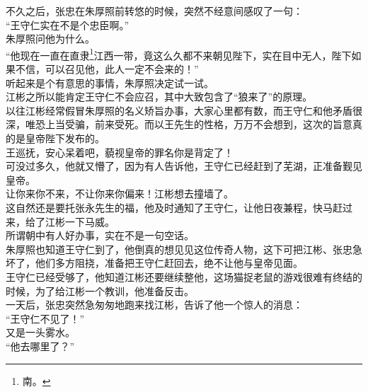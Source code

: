 \begin{multicols}{\theparacolNo}
不久之后，张忠在朱厚照前转悠的时候，突然不经意间感叹了一句：\\

“王守仁实在不是个忠臣啊。”\\

朱厚照问他为什么。\\

“他现在一直在直隶\footnote{南。}江西一带，竟这么久都不来朝见陛下，实在目中无人，陛下如果不信，可以召见他，此人一定不会来的！”\\

听起来是个有意思的事情，朱厚照决定试一试。\\

江彬之所以能肯定王守仁不会应召，其中大致包含了“狼来了”的原理。\\

以往江彬经常假冒朱厚照的名义矫旨办事，大家心里都有数，而王守仁和他矛盾很深，唯恐上当受骗，前来受死。而以王先生的性格，万万不会想到，这次的旨意真的是皇帝陛下发布的。\\

王巡抚，安心呆着吧，藐视皇帝的罪名你是背定了！\\

可没过多久，他就又懵了，因为有人告诉他，王守仁已经赶到了芜湖，正准备觐见皇帝。\\

让你来你不来，不让你来你偏来！江彬想去撞墙了。\\

这自然还是要托张永先生的福，他及时通知了王守仁，让他日夜兼程，快马赶过来，给了江彬一下马威。\\

所谓朝中有人好办事，实在不是一句空话。\\

朱厚照也知道王守仁到了，他倒真的想见见这位传奇人物，这下可把江彬、张忠急坏了，他们多方阻挠，准备把王守仁赶回去，绝不让他与皇帝见面。\\

王守仁已经受够了，他知道江彬还要继续整他，这场猫捉老鼠的游戏很难有终结的时候，为了给江彬一个教训，他准备反击。\\

一天后，张忠突然急匆匆地跑来找江彬，告诉了他一个惊人的消息：\\

“王守仁不见了！”\\

又是一头雾水。\\

“他去哪里了？”\\


\end{multicols}
